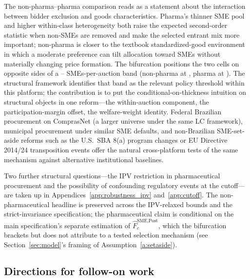 The non-pharma--pharma comparison reads as a statement about the interaction between bidder exclusion and goods characteristics. Pharma's thinner SME pool and higher within-class heterogeneity both raise the expected second-order statistic when non-SMEs are removed and make the selected entrant mix more important; non-pharma is closer to the textbook standardized-good environment in which a moderate preference can tilt allocation toward SMEs without materially changing price formation. The bifurcation positions the two cells on opposite sides of a \smesPerAucBandLo--\smesPerAucBandHi{} SMEs-per-auction band (non-pharma at \bneNsmePostNp{}, pharma at \bneNsmePostPh{}). The structural framework identifies that band as the relevant policy threshold within this platform; the contribution is to put the conditional-on-thickness intuition on structural objects in one reform---the within-auction component, the participation-margin offset, the welfare-weight identity. Federal Brazilian procurement on ComprasNet (a larger universe under the same LC \leiNova{} framework), municipal procurement under similar SME defaults, and non-Brazilian SME-set-aside reforms such as the U.S.\ SBA 8(a) program changes or EU Directive 2014/24 transposition events offer the natural cross-platform tests of the same mechanism against alternative institutional baselines.

Two further structural questions---the IPV restriction in pharmaceutical procurement and the possibility of confounding regulatory events at the \policyCutoffMonth{} cutoff---are taken up in Appendices~\ref{app:robustness_ipv} and~\ref{app:cutoff}. The non-pharmaceutical headline is preserved across the IPV-relaxed bounds and the strict-invariance specification; the pharmaceutical claim is conditional on the main specification's separate estimation of $\hat F_c^{\text{SME,Post}}$, which the bifurcation brackets but does not attribute to a tested selection mechanism (see Section~\ref{sec:model}'s framing of Assumption~\ref{a:setaside}).

\subsection{Directions for follow-on work}

